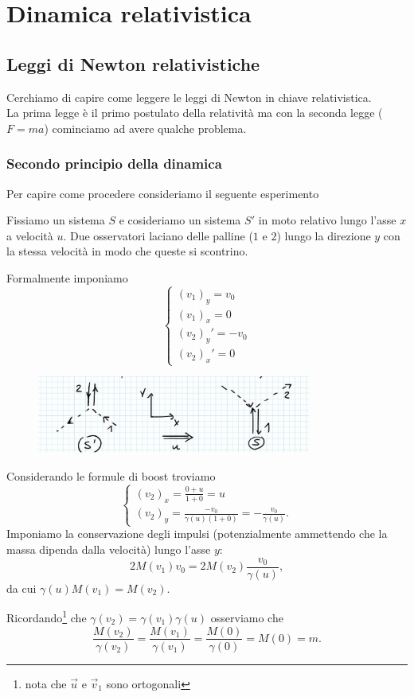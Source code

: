 \chapter{Dinamica relativistica}
\section{Leggi di Newton relativistiche}
Cerchiamo di capire come leggere le leggi di Newton in chiave relativistica.\\
La prima legge \`e il primo postulato della relativit\`a ma con la seconda legge ($F=ma$) cominciamo ad avere qualche problema.

\subsection{Secondo principio della dinamica}
Per capire come procedere consideriamo il seguente esperimento

\begin{example}
Fissiamo un sistema $S$ e cosideriamo un sistema $S'$ in moto relativo lungo l'asse $x$ a velocit\`a $u$. Due osservatori laciano delle palline ($1$ e $2$) lungo la direzione $y$ con la stessa velocit\`a in modo che queste si scontrino.\smallskip

\noindent Formalmente imponiamo
\[\begin{cases}
(v_1)_y=v_0\\
(v_1)_x=0\\
(v_2)_y'=-v_0\\
(v_2)_x'=0
\end{cases}\]
\begin{figure}[!htb]
    \centering
    \includegraphics[width=9cm]{images/Palline_relativistiche_def_massa.png}
\end{figure}

\noindent
Considerando le formule di boost troviamo
\[\begin{cases}
(v_2)_x=\frac{0+u}{1+0}=u\\
(v_2)_y=\frac{-v_0}{\gamma(u)(1+0)}=-\frac{v_0}{\gamma(u)}.
\end{cases}\]
Imponiamo la conservazione degli impulsi (potenzialmente ammettendo che la massa dipenda dalla velocit\`a) lungo l'asse $y$:
\[2M(v_1)v_0=2M(v_2)\frac{v_0}{\gamma(u)},\]
da cui $\gamma(u)M(v_1)=M(v_2)$.\medskip

\noindent Ricordando\footnote{nota che $\vec u$ e $\vec v_1$ sono ortogonali} che $\gamma(v_2)=\gamma(v_1)\gamma(u)$ osserviamo che
\[\frac{M(v_2)}{\gamma(v_2)}=\frac{M(v_1)}{\gamma(v_1)}=\frac{M(0)}{\gamma(0)}=M(0)=m.\]

\end{example}

